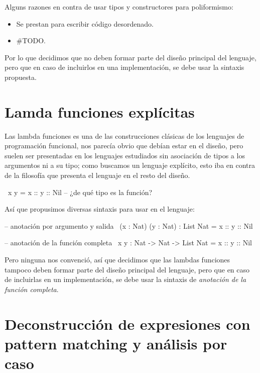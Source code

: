 {\begin{designfr}
Alguns razones en contra de usar tipos y constructores para poliformismo:

\begin{itemize}
    \item Se prestan para escribir código desordenado.
    \item \#TODO.
\end{itemize}

Por lo que decidimos que no deben formar parte del diseño principal del lenguaje, pero que en caso de incluirlos en una implementación, se debe usar la sintaxis propuesta.
\end{designfr}

\section{Lamda funciones explícitas}

\begin{designfr}
Las lambda funciones es una de las construcciones clásicas de los lenguajes de programación funcional, nos parecía obvio que debían estar en el diseño, pero suelen ser presentadas en los lenguajes estudiados sin asociación de tipos a los argumentos ni a su tipo; como buscamos un lenguaje explícito, esto iba en contra de la filosofía que presenta el lenguaje en el resto del diseño.

\begin{anglercode}
\ x y = x :: y :: Nil       -- ¿de qué tipo es la función?
\end{anglercode}

Así que propusimos diversas sintaxis para usar en el lenguaje:

\begin{anglercode}
-- anotación por argumento y salida
\ (x : Nat) (y : Nat) : List Nat = x :: y :: Nil

-- anotación de la función completa
\ x y : Nat -> Nat -> List Nat = x :: y :: Nil
\end{anglercode}

Pero ninguna nos convenció, así que decidimos que las lambdas funciones tampoco deben formar parte del diseño principal del lenguaje, pero que en caso de incluirlas en un implementación, se debe usar la sintaxis de \emph{anotación de la función completa}.
\end{designfr}

\section{Deconstrucción de expresiones con pattern matching y análisis por caso}

}
